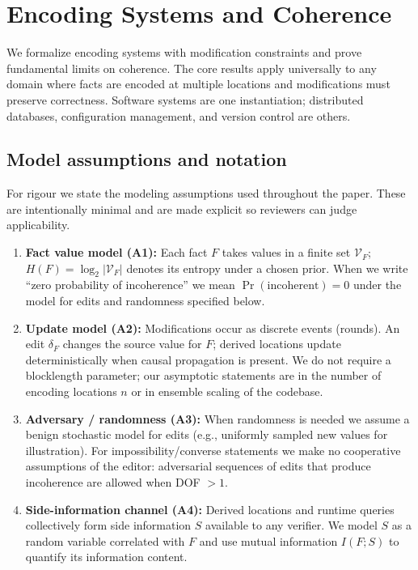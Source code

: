 \section{Encoding Systems and Coherence}\label{sec:foundations}

We formalize encoding systems with modification constraints and prove fundamental limits on coherence. The core results apply universally to any domain where facts are encoded at multiple locations and modifications must preserve correctness. Software systems are one instantiation; distributed databases, configuration management, and version control are others.

\subsection{Model assumptions and notation}\label{sec:assumptions}

For rigour we state the modeling assumptions used throughout the paper. These are intentionally minimal and are made explicit so reviewers can judge applicability.

\begin{enumerate}
\item \textbf{Fact value model (A1):} Each fact $F$ takes values in a finite set $\mathcal{V}_F$; $H(F)=\log_2|\mathcal{V}_F|$ denotes its entropy under a chosen prior. When we write ``zero probability of incoherence'' we mean $\Pr(\text{incoherent})=0$ under the model for edits and randomness specified below.
\item \textbf{Update model (A2):} Modifications occur as discrete events (rounds). An edit $\delta_F$ changes the source value for $F$; derived locations update deterministically when causal propagation is present. We do not require a blocklength parameter; our asymptotic statements are in the number of encoding locations $n$ or in ensemble scaling of the codebase.
\item \textbf{Adversary / randomness (A3):} When randomness is needed we assume a benign stochastic model for edits (e.g., uniformly sampled new values for illustration). For impossibility/converse statements we make no cooperative assumptions of the editor: adversarial sequences of edits that produce incoherence are allowed when DOF $>1$.
\item \textbf{Side-information channel (A4):} Derived locations and runtime queries collectively form side information $S$ available to any verifier. We model $S$ as a random variable correlated with $F$ and use mutual information $I(F;S)$ to quantify its information content.
\end{enumerate}

